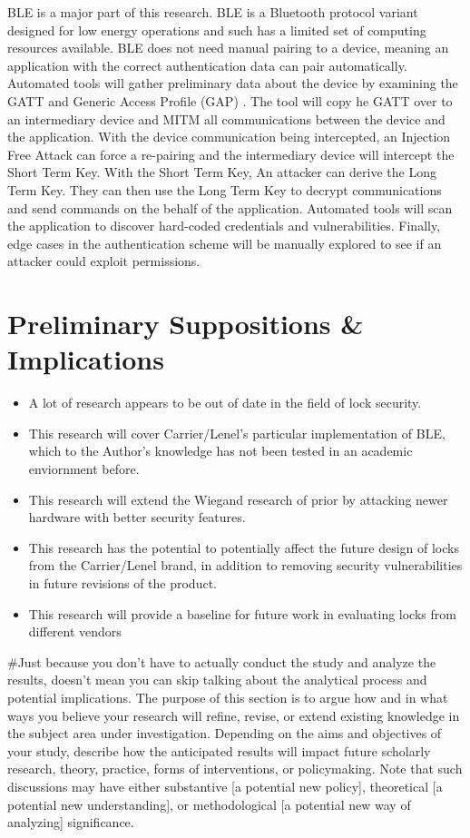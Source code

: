 \documentclass[10pt,twocolumn,letterpaper]{article}
\begin{document}
BLE is a major part of this research. BLE is a Bluetooth protocol variant designed for low energy operations and such has a limited set of computing resources available. BLE does not need manual pairing to a device, meaning an application with the correct authentication data can pair automatically. Automated tools will gather preliminary data about the device by examining the GATT and Generic Access Profile (GAP) . The tool will copy he GATT over to an intermediary device and MITM all communications between the device and the application. With the device communication being intercepted, an Injection Free Attack can force a re-pairing and the intermediary device will intercept the Short Term Key. With the Short Term Key,  An attacker can derive the Long Term Key. They can then use the Long Term Key to decrypt communications and send commands on the behalf of the application. Automated tools will scan the application to discover hard-coded credentials and vulnerabilities. Finally, edge cases in the authentication scheme will be manually explored to see if an attacker could exploit permissions.


\section{Preliminary Suppositions \& Implications}
\begin{itemize}
    \item A lot of research appears to be out of date in the field of lock security.
    \item This research will cover Carrier/Lenel's particular implementation of BLE, which to the Author's knowledge has not been tested in an academic enviornment before.
    \item This research will extend the Wiegand research of prior by attacking newer hardware with better security features.
    \item This research has the potential to potentially affect the future design of locks from the Carrier/Lenel brand, in addition to removing security vulnerabilities in future revisions of the product.
    \item This research will provide a baseline for future work in evaluating locks from different vendors
\end{itemize}
#Just because you don't have to actually conduct the study and analyze the results, doesn't mean you can skip talking about the analytical process and potential implications. The purpose of this section is to argue how and in what ways you believe your research will refine, revise, or extend existing knowledge in the subject area under investigation. Depending on the aims and objectives of your study, describe how the anticipated results will impact future scholarly research, theory, practice, forms of interventions, or policymaking. Note that such discussions may have either substantive [a potential new policy], theoretical [a potential new understanding], or methodological [a potential new way of analyzing] significance.
 
\end{document}
